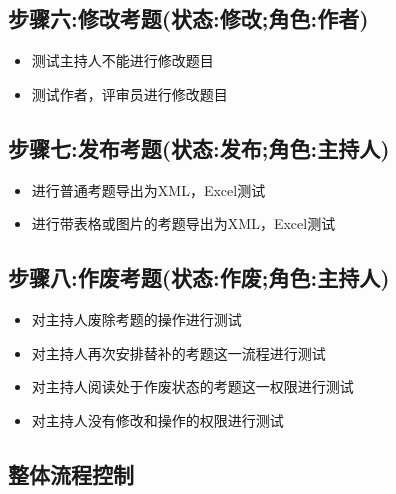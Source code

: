 \documentclass[hyperref, a4paper]{ctexart}
\providecommand{\tightlist}{%
  \setlength{\itemsep}{0pt}\setlength{\parskip}{0pt}}
\begin{document}
\hypertarget{ux6b65ux9aa4ux516dux4feeux6539ux8003ux9898ux72b6ux6001ux4feeux6539ux89d2ux8272ux4f5cux8005}{%
\subsection{步骤六:修改考题(状态:修改;角色:作者)}\label{ux6b65ux9aa4ux516dux4feeux6539ux8003ux9898ux72b6ux6001ux4feeux6539ux89d2ux8272ux4f5cux8005}}

\begin{itemize}
\tightlist
\item
  测试主持人不能进行修改题目
\item
  测试作者，评审员进行修改题目
\end{itemize}

\hypertarget{ux6b65ux9aa4ux4e03ux53d1ux5e03ux8003ux9898ux72b6ux6001ux53d1ux5e03ux89d2ux8272ux4e3bux6301ux4eba}{%
\subsection{步骤七:发布考题(状态:发布;角色:主持人)}\label{ux6b65ux9aa4ux4e03ux53d1ux5e03ux8003ux9898ux72b6ux6001ux53d1ux5e03ux89d2ux8272ux4e3bux6301ux4eba}}

\begin{itemize}
\tightlist
\item
  进行普通考题导出为XML，Excel测试
\item
  进行带表格或图片的考题导出为XML，Excel测试
\end{itemize}

\hypertarget{ux6b65ux9aa4ux516bux4f5cux5e9fux8003ux9898ux72b6ux6001ux4f5cux5e9fux89d2ux8272ux4e3bux6301ux4eba}{%
\subsection{步骤八:作废考题(状态:作废;角色:主持人)}\label{ux6b65ux9aa4ux516bux4f5cux5e9fux8003ux9898ux72b6ux6001ux4f5cux5e9fux89d2ux8272ux4e3bux6301ux4eba}}

\begin{itemize}
\tightlist
\item
  对主持人废除考题的操作进行测试
\item
  对主持人再次安排替补的考题这一流程进行测试
\item
  对主持人阅读处于作废状态的考题这一权限进行测试
\item
  对主持人没有修改和操作的权限进行测试
\end{itemize}

\hypertarget{ux6574ux4f53ux6d41ux7a0bux63a7ux5236}{%
\subsection{整体流程控制}\label{ux6574ux4f53ux6d41ux7a0bux63a7ux5236}}
\end{document}
